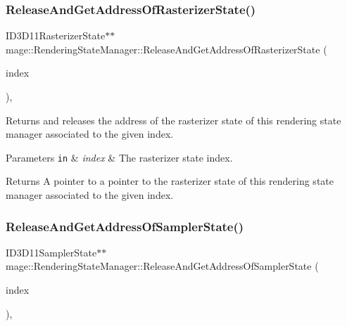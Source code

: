 \subsubsection{\texorpdfstring{Release\+And\+Get\+Address\+Of\+Rasterizer\+State()}{ReleaseAndGetAddressOfRasterizerState()}}
{\footnotesize\ttfamily I\+D3\+D11\+Rasterizer\+State$\ast$$\ast$ mage\+::\+Rendering\+State\+Manager\+::\+Release\+And\+Get\+Address\+Of\+Rasterizer\+State (\begin{DoxyParamCaption}\item[{\hyperlink{classmage_1_1_rendering_state_manager_aa8eee3b02b7d4ba0a046870fae43640a}{Rasterizer\+State\+Index}}]{index }\end{DoxyParamCaption})\hspace{0.3cm}{\ttfamily [private]}, {\ttfamily [noexcept]}}

Returns and releases the address of the rasterizer state of this rendering state manager associated to the given index.


\begin{DoxyParams}[1]{Parameters}
\mbox{\tt in}  & {\em index} & The rasterizer state index. \\
\hline
\end{DoxyParams}
\begin{DoxyReturn}{Returns}
A pointer to a pointer to the rasterizer state of this rendering state manager associated to the given index. 
\end{DoxyReturn}
\hypertarget{classmage_1_1_rendering_state_manager_accd84565ba05048034ab2b2fd3a22ec7}{}\label{classmage_1_1_rendering_state_manager_accd84565ba05048034ab2b2fd3a22ec7} 
\subsubsection{\texorpdfstring{Release\+And\+Get\+Address\+Of\+Sampler\+State()}{ReleaseAndGetAddressOfSamplerState()}}
{\footnotesize\ttfamily I\+D3\+D11\+Sampler\+State$\ast$$\ast$ mage\+::\+Rendering\+State\+Manager\+::\+Release\+And\+Get\+Address\+Of\+Sampler\+State (\begin{DoxyParamCaption}\item[{\hyperlink{classmage_1_1_rendering_state_manager_a17ea0fda0247ee5d379b62a882db95a3}{Sampler\+State\+Index}}]{index }\end{DoxyParamCaption})\hspace{0.3cm}{\ttfamily [private]}, {\ttfamily [noexcept]}}

